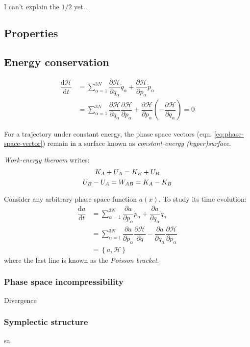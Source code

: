 \documentclass[
  10pt,
  twoside,
  openany,
  b5paper, %
  colorscheme = bootstrap-v4, %
]{qyxf-book}
\newcommand{\der}[2]{\dfrac{\md #1}{\md #2}}
\newcommand{\p}[2]{\dfrac{\partial #1}{\partial #2}}
\newcommand{\md}{\mathrm{d}}
\newcommand{\suman}{\sum_{\alpha=1}^{3N}}
\newcommand{\ham}{\mathcal{H}} %
\begin{document}
\supplement I can't explain the $1/2$ yet...

\subsection{Properties}

\vspace{0.5em}
\subsection{Energy conservation}
\begin{align*}
	\der{\ham}{t}&=\suman \p{\ham}{q_\alpha}\dot{q}_\alpha+\p{\ham}{p_\alpha}\dot{p}_\alpha\\
	&=\suman\p{\ham}{q_\alpha}\p{\ham}{p_\alpha}+\p{\ham}{p_\alpha}(-\p{\ham}{q_\alpha})=0
\end{align*}

For a trajectory under constant energy, the phase space vectors (eqn. \ref{eq:phase-space-vector}) remain in a surface known as \textit{constant-energy (hyper)surface}.

\textit{Work-energy theroem} writes:
\begin{gather}
	K_A+U_A=K_B+U_B \notag\\
	U_B-U_A=W_{AB}=K_A-K_B
\end{gather}

Consider any arbitrary phase space function $a(x)$. To study its time evolution:
\begin{align*}
	\der{a}{t}&=\suman\p{a}{p_\alpha}\dot{p}_\alpha+\p{a}{q_\alpha}\dot{q}_\alpha\\
	&=\suman\p{a}{p_\alpha}\p{\ham}{q}-\p{a}{q_\alpha}\p{\ham}{p_\alpha}\\
	&=\left\{a,\ham\right\} \label{eq:poisson-bracket}
\end{align*}
where the last line is known as the \textit{Poisson bracket}.

\subsubsection{Phase space incompressibility}

Divergence

\subsubsection{Symplectic structure}


sa
\end{document}

